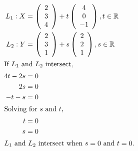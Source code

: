 \documentclass[12pt]{article}
\newenvironment{problem}[2][Problem]{\begin{trivlist}
\item[\hskip \labelsep {\bfseries #1}\hskip \labelsep {\bfseries #2.}]}{\end{trivlist}}
\begin{document}
\begin{problem}{2.a}
\end{problem}
\begin{align*}
L_1 : X &= 
\left( \begin{array}{c}
	2\\
	3\\
	4\\
\end{array} \right)
+ t
\left( \begin{array}{c}
	4\\
	0\\
	-1\\
\end{array} \right)
, 
t \in \mathbb{R} \\
L_2 : Y &= 
\left( \begin{array}{c}
	2\\
	3\\
	1\\
\end{array} \right)
+ s
\left( \begin{array}{c}
	2\\
	2\\
	1\\
\end{array} \right)
, 
s \in \mathbb{R} \\
\intertext{If $L_1$ and $L_2$ intersect,}
4t - 2s &= 0 \\
2s &= 0 \\
-t - s &= 0\\
\intertext{Solving for $s$ and $t$,}
t &= 0 \\
s &= 0 \\
\intertext{$L_1$ and $L_2$ intersect when $s=0$ and $t=0$.}
\end{align*}
\filbreak
\end{document}
